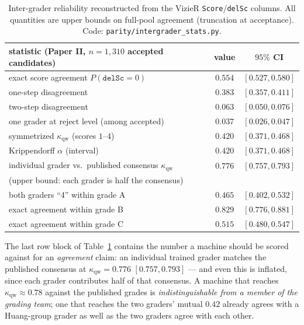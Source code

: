\documentclass[11pt,letterpaper]{article}
\newcommand{\qwk}{\ensuremath{\kappa_{\mathrm{qw}}}}
\begin{document}
\begin{table}[t]
\centering\small
\begin{tabular}{lcc}
\hline
statistic (Paper II, $n=1{,}310$ accepted candidates) & value & $95\%$ CI \\
\hline
exact score agreement $P(\texttt{delSc}=0)$            & $0.554$ & $[0.527, 0.580]$ \\
one-step disagreement                                  & $0.383$ & $[0.357, 0.411]$ \\
two-step disagreement                                  & $0.063$ & $[0.050, 0.076]$ \\
one grader at reject level (among accepted)            & $0.037$ & $[0.026, 0.047]$ \\
symmetrized \qwk{} (scores $1$--$4$)                   & $0.420$ & $[0.371, 0.468]$ \\
Krippendorff $\alpha$ (interval)                       & $0.420$ & $[0.371, 0.468]$ \\
individual grader vs.\ published consensus \qwk{}      & $0.776$ & $[0.757, 0.793]$ \\
\quad (upper bound: each grader is half the consensus) & & \\
both graders ``4'' within grade A                      & $0.465$ & $[0.402, 0.532]$ \\
exact agreement within grade B                         & $0.829$ & $[0.776, 0.881]$ \\
exact agreement within grade C                         & $0.515$ & $[0.480, 0.547]$ \\
\hline
\end{tabular}
\caption{Inter-grader reliability reconstructed from the \citet{huang2021desi} VizieR
\texttt{Score}/\texttt{delSc} columns. All quantities are upper bounds on full-pool agreement
(truncation at acceptance). Code: \texttt{parity/intergrader\_stats.py}.}\label{tab:reliability}
\end{table}

The last row block of Table~\ref{tab:reliability} contains the number a machine should be
scored against for an \emph{agreement} claim: an individual trained grader matches the
published consensus at $\qwk=0.776$ $[0.757,0.793]$ --- and even this is inflated, since each
grader contributes half of that consensus. A machine that reaches
$\qwk\approx0.78$ against the published grades is \emph{indistinguishable from a member of the
grading team}; one that reaches the two graders' mutual $0.42$ already agrees with a Huang-group
grader as well as the two graders agree with each other.
\end{document}
